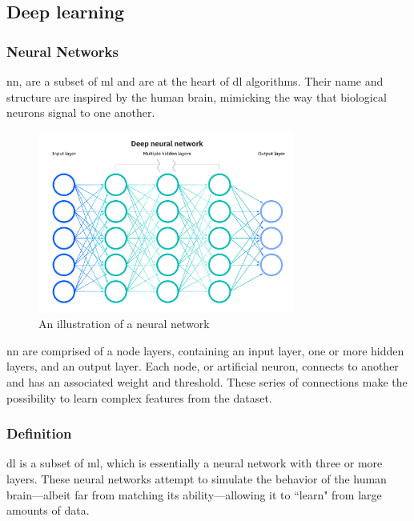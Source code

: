 \subsection{Deep learning}
\subsubsection{Neural Networks}
\acrfull{nn}, are a subset of \acrfull{ml} and are at the heart of \acrfull{dl} algorithms. Their name and structure are inspired by the human brain, mimicking the way that biological neurons signal to one another.

\begin{figure}[H]
	\centering
	\includegraphics[width=0.75\textwidth]{Figures/NeuralNetwork.png}
	\caption{An illustration of a neural network}
\end{figure}
\FloatBarrier

\acrshort{nn} are comprised of a node layers, containing an input layer, one or more hidden layers, and an output layer. Each node, or artificial neuron, connects to another and has an associated weight and threshold. These series of connections make the possibility to learn complex features from the dataset.

\subsubsection{Definition}
\acrfull{dl} is a subset of \acrfull{ml}, which is essentially a neural network with three or more layers. These neural networks attempt to simulate the behavior of the human brain—albeit far from matching its ability—allowing it to ``learn" from large amounts of data. 


